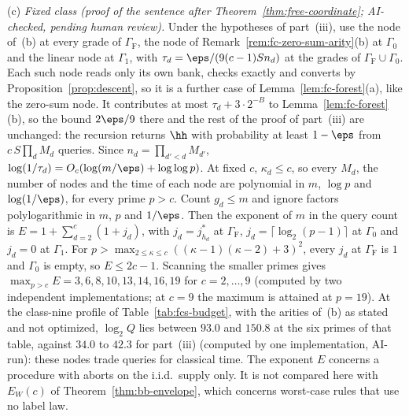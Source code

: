 \begin{remark}
\textup{(c)} \emph{Fixed class (proof of the sentence after Theorem~\ref{thm:free-coordinate}; AI-checked, pending human review).} Under the hypotheses of part~(iii), use the node of~(b) at every grade of $\Gamma_{\mathrm F}$, the node of Remark~\ref{rem:fc-zero-sum-arity}(b) at $\Gamma_0$ and the linear node at $\Gamma_1$, with $\tau_d = \eps/(9(c-1)Sn_d)$ at the grades of $\Gamma_{\mathrm F}\cup\Gamma_0$. Each such node reads only its own bank, checks exactly and converts by Proposition~\ref{prop:descent}, so it is a further case of Lemma~\ref{lem:fc-forest}(a), like the zero-sum node. It contributes at most $\tau_d + 3\cdot2^{-B}$ to Lemma~\ref{lem:fc-forest}(b), so the bound $2\eps/9$ there and the rest of the proof of part~(iii) are unchanged: the recursion returns $\hh$ with probability at least $1-\eps$ from $c\,S\prod_dM_d$ queries. Since $n_d = \prod_{d'<d}M_{d'}$, $\log(1/\tau_d) = O_c(\log(m/\eps) + \log\log p)$. At fixed $c$, $\kappa_d \le c$, so every $M_d$, the number of nodes and the time of each node are polynomial in $m$, $\log p$ and $\log(1/\eps)$, for every prime $p > c$. Count $g_d \le m$ and ignore factors polylogarithmic in $m$, $p$ and $1/\eps$. Then the exponent of $m$ in the query count is $E = 1 + \sum_{d=2}^c(1 + j_d)$, with $j_d = j^*_{h_d}$ at $\Gamma_{\mathrm F}$, $j_d = \lceil\log_2(p-1)\rceil$ at $\Gamma_0$ and $j_d = 0$ at $\Gamma_1$. For $p > \max_{2\le\kappa\le c}((\kappa-1)(\kappa-2)+3)^2$, every $j_d$ at $\Gamma_{\mathrm F}$ is $1$ and $\Gamma_0$ is empty, so $E \le 2c-1$. Scanning the smaller primes gives $\max_{p>c}E = 3, 6, 8, 10, 13, 14, 16, 19$ for $c = 2,\dots,9$ (computed by two independent implementations; at $c = 9$ the maximum is attained at $p = 19$). At the class-nine profile of Table~\ref{tab:fcs-budget}, with the arities of~(b) as stated and not optimized, $\log_2Q$ lies between $93.0$ and $150.8$ at the six primes of that table, against $34.0$ to $42.3$ for part~(iii) (computed by one implementation, AI-run): these nodes trade queries for classical time. The exponent $E$ concerns a procedure with aborts on the i.i.d.\ supply only. It is not compared here with $E_W(c)$ of Theorem~\ref{thm:bb-envelope}, which concerns worst-case rules that use no label law.


\end{remark}
